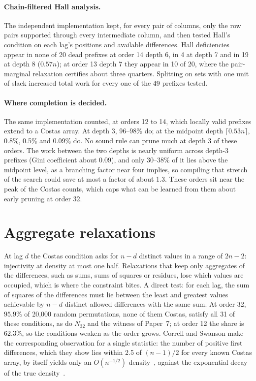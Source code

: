 \documentclass[11pt,a4paper,oneside]{report}
\theoremstyle{definition}
\begin{document}
\paragraph{Chain-filtered Hall analysis.} The independent implementation kept, for every pair of columns,
only the row pairs supported through every intermediate column, and then tested Hall's condition on each
lag's positions and available differences. Hall deficiencies appear in none of 20 dead prefixes at order 14
depth 6, in 4 at depth 7 and in 19 at depth 8 ($0.57n$); at order 13 depth 7 they appear in 10 of 20,
where the pair-marginal relaxation certifies about three quarters. Splitting on sets with one unit of slack
increased total work for every one of the 49 prefixes tested.

\paragraph{Where completion is decided.} The same implementation counted, at orders 12 to 14, which locally
valid prefixes extend to a Costas array. At depth 3, 96--98\% do; at the midpoint depth $\lceil0.53n\rceil$,
0.8\%, 0.5\% and 0.09\% do. No sound rule can prune much at depth 3 of these orders. The work between the two
depths is nearly uniform across depth-3 prefixes (Gini coefficient about 0.09), and only 30--38\% of it lies
above the midpoint level, as a branching factor near four implies, so compiling that stretch of the search
could save at most a factor of about 1.3. These orders sit near the peak of the Costas counts, which caps
what can be learned from them about early pruning at order 32.

\section{Aggregate relaxations}
\label{p10-sec:aggregate}
At lag $d$ the Costas condition asks for $n-d$ distinct values in a range of $2n-2$: injectivity at density
at most one half. Relaxations that keep only aggregates of the differences, such as sums, sums of squares
or residues, lose which values are occupied, which is where the constraint bites. A direct test: for each
lag, the sum of squares of the differences must lie between the least and greatest values achievable by
$n-d$ distinct allowed differences with the same sum. At order 32, $95.9\%$ of 20{,}000 random permutations,
none of them Costas, satisfy all 31 of these conditions, as do $N_{32}$ and the witness of Paper~7; at
order 12 the share is $62.3\%$, so the conditions weaken as the order grows. Correll and Swanson make the
corresponding observation for a single statistic: the number of positive first differences, which they
show lies within 2.5 of $(n-1)/2$ for every known Costas array, by itself yields only an $O(n^{-1/2})$
density~\cite{p10-correll2023difference}, against the exponential decay of the true
density~\cite{p10-warnke2023density}.
\end{document}
